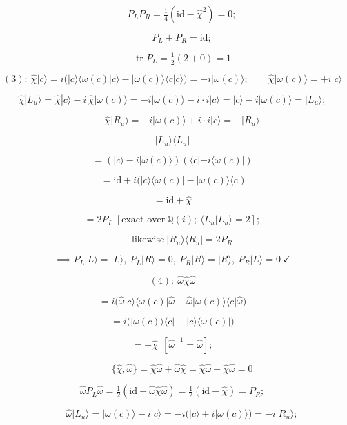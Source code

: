 \begin{theorem}
\[
\qquad P_LP_R=\tfrac14(\mathrm{id}-\hat\chi^2)=0;
\]

\[
\qquad P_L+P_R=\mathrm{id};
\]

\[
\qquad \operatorname{tr}P_L=\tfrac12(2+0)=1
\]

\[
(3):\ \hat\chi|c\rangle=i\bigl(|c\rangle\langle\omega(c)|c\rangle-|\omega(c)\rangle\langle c|c\rangle\bigr)=-i|\omega(c)\rangle;\qquad\hat\chi|\omega(c)\rangle=+i|c\rangle
\]

\[
\hat\chi|L_u\rangle=\hat\chi|c\rangle-i\,\hat\chi|\omega(c)\rangle=-i|\omega(c)\rangle-i\cdot i|c\rangle=|c\rangle-i|\omega(c)\rangle=|L_u\rangle;
\]

\[
\qquad \hat\chi|R_u\rangle=-i|\omega(c)\rangle+i\cdot i|c\rangle=-|R_u\rangle
\]

\[
|L_u\rangle\langle L_u|
\]

\[
= (|c\rangle-i|\omega(c)\rangle)(\langle c|+i\langle\omega(c)|)
\]

\[
= \mathrm{id}+i\bigl(|c\rangle\langle\omega(c)|-|\omega(c)\rangle\langle c|\bigr)
\]

\[
= \mathrm{id}+\hat\chi
\]

\[
= 2P_L\ [\text{exact over}\ \mathbb Q(i);\ \langle L_u|L_u\rangle=2];
\]

\[
\qquad \text{likewise}\ |R_u\rangle\langle R_u|=2P_R
\]

\[
\implies P_L|L\rangle=|L\rangle,\ P_L|R\rangle=0,\ P_R|R\rangle=|R\rangle,\ P_R|L\rangle=0\ \checkmark
\]

\[
(4):\ \hat\omega\hat\chi\hat\omega
\]

\[
= i\bigl(\hat\omega|c\rangle\langle\omega(c)|\hat\omega-\hat\omega|\omega(c)\rangle\langle c|\hat\omega\bigr)
\]

\[
= i\bigl(|\omega(c)\rangle\langle c|-|c\rangle\langle\omega(c)|\bigr)
\]

\[
= -\hat\chi\ \ [\hat\omega^{-1}=\hat\omega];
\]

\[
\qquad \{\hat\chi,\hat\omega\}=\hat\chi\hat\omega+\hat\omega\hat\chi=\hat\chi\hat\omega-\hat\chi\hat\omega=0
\]

\[
\hat\omega P_L\hat\omega=\tfrac12(\mathrm{id}+\hat\omega\hat\chi\hat\omega)=\tfrac12(\mathrm{id}-\hat\chi)=P_R;
\]

\[
\qquad \hat\omega|L_u\rangle=|\omega(c)\rangle-i|c\rangle=-i\bigl(|c\rangle+i|\omega(c)\rangle\bigr)=-i|R_u\rangle;
\]


\end{theorem}
